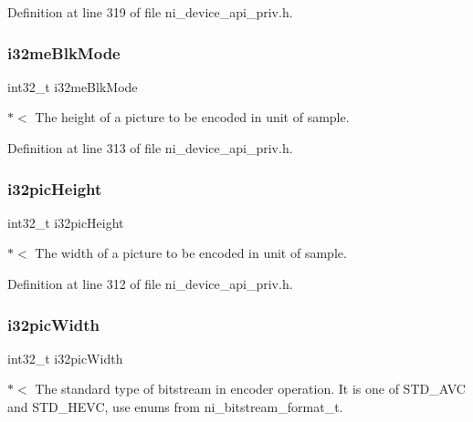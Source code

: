 Definition at line 319 of file ni\+\_\+device\+\_\+api\+\_\+priv.\+h.

\mbox{\label{struct__ni__encoder__config__t_a425b4405b9fb54c132b4c2f86d10c8d3}} 
\subsubsection{\texorpdfstring{i32meBlkMode}{i32meBlkMode}}
{\footnotesize\ttfamily int32\+\_\+t i32me\+Blk\+Mode}

$\ast$$<$ The height of a picture to be encoded in unit of sample. 

Definition at line 313 of file ni\+\_\+device\+\_\+api\+\_\+priv.\+h.

\mbox{\label{struct__ni__encoder__config__t_a95322a823ea7810a23f556358f376c95}} 
\subsubsection{\texorpdfstring{i32picHeight}{i32picHeight}}
{\footnotesize\ttfamily int32\+\_\+t i32pic\+Height}

$\ast$$<$ The width of a picture to be encoded in unit of sample. 

Definition at line 312 of file ni\+\_\+device\+\_\+api\+\_\+priv.\+h.

\mbox{\label{struct__ni__encoder__config__t_a85f10b6b600cc11c8f957aa462c1b658}} 
\subsubsection{\texorpdfstring{i32picWidth}{i32picWidth}}
{\footnotesize\ttfamily int32\+\_\+t i32pic\+Width}

$\ast$$<$ The standard type of bitstream in encoder operation. It is one of S\+T\+D\+\_\+\+A\+VC and S\+T\+D\+\_\+\+H\+E\+VC, use enums from ni\+\_\+bitstream\+\_\+format\+\_\+t. 

